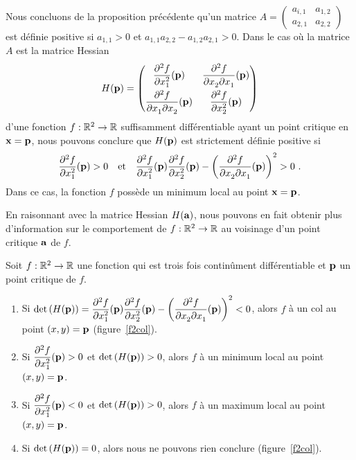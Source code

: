 {Nous concluons de la proposition précédente qu'un matrice
$A = \begin{pmatrix}   a_{i,1} & a_{1,2} \\   a_{2,1} & a_{2,2} \end{pmatrix}$
est définie positive si
$a_{1,1} >0$ et $a_{1,1} a_{2,2} - a_{1,2}a_{2,1} > 0$.
Dans le cas où la matrice $A$ est la matrice Hessian 
\[
H(\VEC{p}) = \begin{pmatrix} \DS \pdydxn{f}{x_1}{2}(\VEC{p})
& \DS \pdydxnm{f}{x_2}{x_1}{2}{}{}(\VEC{p}) \\[0.9em]
\DS \pdydxnm{f}{x_1}{x_2}{2}{}{}(\VEC{p}) &
\DS \pdydxn{f}{x_2}{2}(\VEC{p})
\end{pmatrix}
\]
d'une fonction $f:\RR^2 \to \RR$ suffisamment différentiable ayant un
point critique en $\VEC{x} = \VEC{p}$, nous pouvons conclure que
$H(\VEC{p})$ est strictement définie positive si
\[
\pdydxn{f}{x_1}{2}(\VEC{p}) > 0 \quad \text{et} \quad
\pdydxn{f}{x_1}{2}(\VEC{p}) \pdydxn{f}{x_2}{2}(\VEC{p}) -
\left(\pdydxnm{f}{x_2}{x_1}{2}{}{}(\VEC{p})\right)^2 > 0 \ .
\]
Dans ce cas, la fonction $f$ possède un minimum local au
point $\VEC{x} = \VEC{p}$.

En raisonnant avec la matrice Hessian $H(\VEC{a})$, nous pouvons en fait
obtenir plus d'information sur le comportement de $f:\RR^2 \to \RR$ au
voisinage d'un point critique $\VEC{a}$ de $f$.

\begin{prop}\label{R2HessCases}
Soit $f:\RR^2 \to \RR$ une fonction qui est trois fois continûment
différentiable et $\VEC{p}$ un point critique de $f$.
\begin{enumerate}
\item Si
$\DS \det\left(H(\VEC{p})\right)
= \pdydxn{f}{x_1}{2}(\VEC{p}) \pdydxn{f}{x_2}{2}(\VEC{p}) -
\left(\pdydxnm{f}{x_2}{x_1}{2}{}{}(\VEC{p})\right)^2 < 0$,
alors $f$ à un col au point $(x,y) = \VEC{p}$ (figure~\ref{f2col}).
\item Si
$\DS \pdydxn{f}{x_1}{2}(\VEC{p}) > 0$ et
$\DS \det\left(H(\VEC{p})\right) > 0$,
alors $f$ à un minimum local au point $(x,y) = \VEC{p}$.
\item Si
$\DS \pdydxn{f}{x_1}{2}(\VEC{p}) < 0$ et
$\DS \det\left(H(\VEC{p})\right) > 0$,
alors $f$ à un maximum local au point $(x,y) = \VEC{p}$.
\item Si
$\DS \det\left(H(\VEC{p})\right) = 0$,
alors nous ne pouvons rien conclure (figure~\ref{f2col}).
\end{enumerate}
\end{prop}

}
